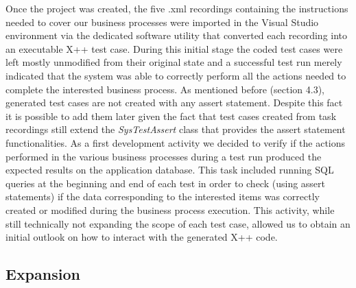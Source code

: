 Once the project was created, the five .xml recordings containing the instructions needed to cover our business processes were imported in the Visual Studio environment via the dedicated software utility that converted each recording into an executable X++ test case. During this initial stage the coded test cases were left mostly unmodified from their original state and a successful test run merely indicated that the system was able to correctly perform all the actions needed to complete the interested business process. As mentioned before (section 4.3), generated test cases are not created with any assert statement. Despite this fact it is possible to add them later given the fact that test cases created from task recordings still extend the \textit{SysTestAssert} class that provides the assert statement functionalities. As a first development activity we decided to verify if the actions performed in the various business processes during a test run produced the expected results on the application database. This task included running SQL queries at the beginning and end of each test in order to check (using assert statements) if the data corresponding to the interested items was correctly created or modified during the business process execution. This activity, while still technically not expanding the scope of each test case, allowed us to obtain an initial outlook on how to interact with the generated X++ code.

\subsection{Expansion}

